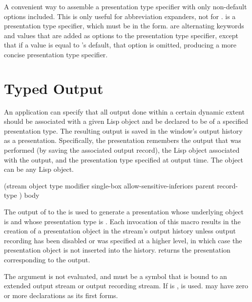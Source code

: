 A convenient way to assemble a presentation type specifier with only non-default
options included.  This is only useful for abbreviation expanders, not for
.   is a presentation type
specifier, which must be in the  form.
 are alternating keywords and values that are added as options to
the presentation type specifier, except that if a value is equal to
's default, that option is omitted, producing a more concise
presentation type specifier.


\section {Typed Output}

An application can specify that all output done within a certain dynamic extent
should be associated with a given Lisp object and be declared to be of a
specified presentation type.  The resulting output is saved in the window's
output history as a presentation.  Specifically, the presentation remembers the
output that was performed (by saving the associated output record), the Lisp
object associated with the output, and the presentation type specified at output
time.  The object can be any Lisp object.


 {(stream object type
                                          \key modifier single-box allow-sensitive-inferiors
                                               parent record-type \allow)
                                         \body body} 

The output of  to the   is
used to generate a presentation whose underlying object is  and
whose presentation type is .  Each invocation of this macro results in
the creation of a presentation object in the stream's output history unless
output recording has been disabled or  was
specified at a higher level, in which case the presentation object is not
inserted into the history.   returns the
presentation corresponding to the output.

The  argument is not evaluated, and must be a symbol that is bound
to an extended output stream or output recording stream.  If  is
,  is used.  may have zero or more
declarations as its first forms.


